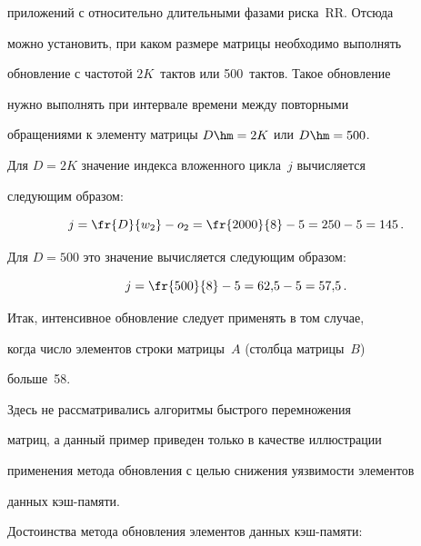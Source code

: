 приложений с относительно длительными фазами риска~RR. Отсюда 

можно установить, при каком размере матрицы необходимо выполнять 

обновление с частотой $2K$~тактов или 500~тактов. Такое обновление 

нужно выполнять при интервале времени между повторными 

обращениями к элементу матрицы $D\hm= 2K$ или $D\hm= 500$.

    

    Для $D= 2K$ значение индекса вложенного цикла~$j$ вычисляется 

следующим образом:

    $$

    j = \fr{D}{w_2} -o_2= \fr{2000}{8}- 5 = 250 - 5 = 145\,.

    $$

    

    Для $D = 500$ это значение вычисляется следующим образом:

    $$

    j = \fr{500}{8}- 5 =62{,}5 - 5 = 57{,}5\,.

    $$

Итак, интенсивное обновление следует применять в том случае, 

когда число элементов строки матрицы~$A$ (столбца матрицы~$B$) 

больше~58. 

    

    Здесь не рассматривались алгоритмы быстрого перемножения 

матриц, а данный пример приведен только в качестве иллюстрации 

применения метода обновления с целью снижения уязвимости элементов 

данных кэш-памяти. 

    

    Достоинства метода обновления элементов данных кэш-памяти:

